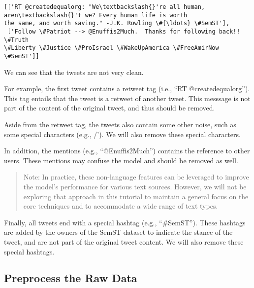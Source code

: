 \documentclass[11pt]{article}
\makeatletter
\newcommand{\boxspacing}{\kern\kvtcb@left@rule\kern\kvtcb@boxsep}
\newcommand{\prompt}[4]{
        {\ttfamily\llap{{\color{#2}[#3]:\hspace{3pt}#4}}\vspace{-\baselineskip}}
    }
\makeatother
\begin{document}
            \begin{tcolorbox}[breakable, size=fbox, boxrule=.5pt, pad at break*=1mm, opacityfill=0]
\prompt{Out}{outcolor}{ }{\boxspacing}
\begin{Verbatim}[commandchars=\\\{\}]
[['RT @createdequalorg: "We\textbackslash{}'re all human, aren\textbackslash{}'t we? Every human life is worth
the same, and worth saving." -J.K. Rowling \#{\ldots} \#SemST'],
 ['Follow \#Patriot --> @Enuffis2Much.  Thanks for following back!!  \#Truth
\#Liberty \#Justice \#ProIsrael \#WakeUpAmerica \#FreeAmirNow \#SemST']]
\end{Verbatim}
\end{tcolorbox}
        
    We can see that the tweets are not very clean.

For example, the first tweet contains a retweet tag (i.e., ``RT
@createdequalorg''). This tag entails that the tweet is a retweet of
another tweet. This messsage is not part of the content of the original
tweet, and thus should be removed.

    Aside from the retweet tag, the tweets also contain some other noise,
such as some special characters (e.g., /'). We will also remove these
special characters.

In addition, the mentions (e.g., ``@Enuffis2Much'') contains the
reference to other users. These mentions may confuse the model and
should be removed as well.

    \begin{quote}
Note: In practice, these non-language features can be leveraged to
improve the model's performance for various text sources. However, we
will not be exploring that approach in this tutorial to maintain a
general focus on the core techniques and to accommodate a wide range of
text types.
\end{quote}

    Finally, all tweets end with a special hashtag (e.g., ``\#SemST'').
These hashtags are added by the owners of the SemST dataset to indicate
the stance of the tweet, and are not part of the original tweet content.
We will also remove these special hashtags.

    \hypertarget{preprocess-the-raw-data}{%
\subsection{Preprocess the Raw Data}\label{preprocess-the-raw-data}}
\end{document}
